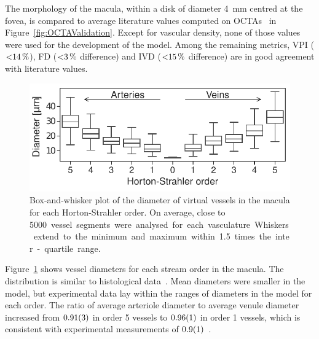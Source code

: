 \documentclass[11pt,]{article}
\begin{document}
The morphology of the macula, within a disk of diameter \SI{4}{\mm} centred at the fovea, is compared to average literature values computed on OCTAs~\cite{Chu2016,Liu_2021,Ma2021} in Figure~\ref{fig:OCTAValidation}.
Except for vascular density, none of those values were used for the development of the model.
Among the remaining metrics, VPI ($\SI{<14}{\percent}$), FD ($\SI{<3}{\percent}$ difference) and IVD ($\SI{<15}{\percent}$ difference) are in good agreement with literature values.

\begin{figure}[ht!]
  \centering
  \includegraphics[width=.95\textwidth]{Horton_Strahler_Diameter_Distribution}
  \caption{\label{fig:Horton_Strahler}Box-and-whisker plot of the diameter of virtual vessels in the macula for each Horton-Strahler order. On average, close to \SI{5000} vessel segments were analysed for each vasculature. Whiskers extend to the minimum and maximum within \SI{1.5}{} times the inter-quartile range.}  
\end{figure}

Figure~\ref{fig:Horton_Strahler} shows vessel diameters for each stream order in the macula.
The distribution is similar to histological data~\cite{An2020}.
Mean diameters were smaller in the model, but experimental data lay within the ranges of diameters in the model for each order.
The ratio of average arteriole diameter to average venule diameter increased from $\SI{0.91\pm 0.03}{}$
in order 5 vessels to $\SI{0.96\pm0.01}{}$ in order 1 vessels, which is consistent with experimental measurements of $\SI{0.9\pm0.1}{}$~\cite{Goldenberg2013}.  
\end{document}
